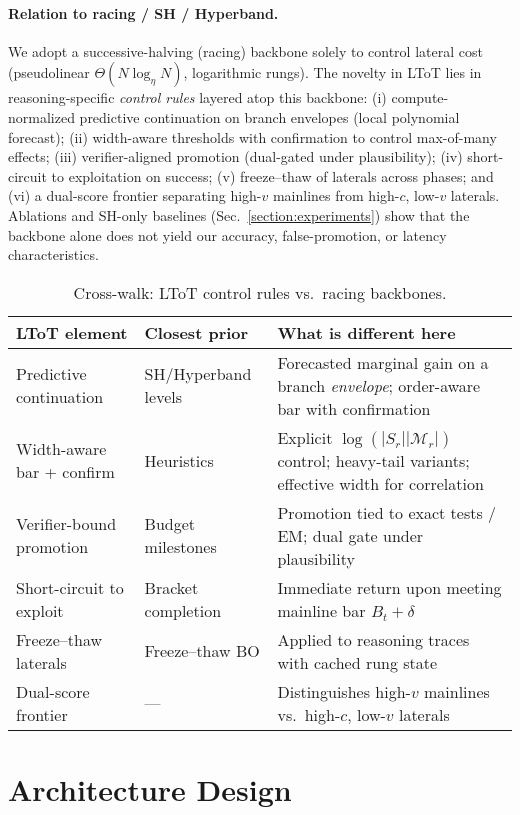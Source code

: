\documentclass{article}
\begin{document}
\paragraph{Relation to racing / SH / Hyperband.}
We adopt a successive-halving (racing) backbone solely to control lateral cost (pseudolinear $\Theta(N\log_\eta N)$, logarithmic rungs).
The novelty in LToT lies in reasoning-specific \emph{control rules} layered atop this backbone:
(i) compute-normalized predictive continuation on branch envelopes (local polynomial forecast);
(ii) width-aware thresholds with confirmation to control max-of-many effects;
(iii) verifier-aligned promotion (dual-gated under plausibility);
(iv) short-circuit to exploitation on success;
(v) freeze--thaw of laterals across phases; and
(vi) a dual-score frontier separating high-$v$ mainlines from high-$c$, low-$v$ laterals.
Ablations and SH-only baselines (Sec.~\ref{section:experiments}) show that the backbone alone does not yield our accuracy, false-promotion, or latency characteristics.

\begin{table}[t]
\centering
\small
\begin{tabular}{@{}p{2.9cm}p{3.0cm}p{6.7cm}@{}}
\toprule
\textbf{LToT element} & \textbf{Closest prior} & \textbf{What is different here} \\
\midrule
Predictive continuation & SH/Hyperband levels & Forecasted marginal gain on a branch \emph{envelope}; order-aware bar with confirmation \\
Width-aware bar + confirm & Heuristics & Explicit $\log(|S_r||\mathcal{M}_r|)$ control; heavy-tail variants; effective width for correlation \\
Verifier-bound promotion & Budget milestones & Promotion tied to exact tests / EM; dual gate under plausibility \\
Short-circuit to exploit & Bracket completion & Immediate return upon meeting mainline bar $B_t+\delta$ \\
Freeze--thaw laterals & Freeze--thaw BO & Applied to reasoning traces with cached rung state \\
Dual-score frontier & --- & Distinguishes high-$v$ mainlines vs.\ high-$c$, low-$v$ laterals \\
\bottomrule
\end{tabular}
\caption{Cross-walk: LToT control rules vs.\ racing backbones.}
\end{table}
\section{Architecture Design}
\label{section:architecture-design}
\end{document}
